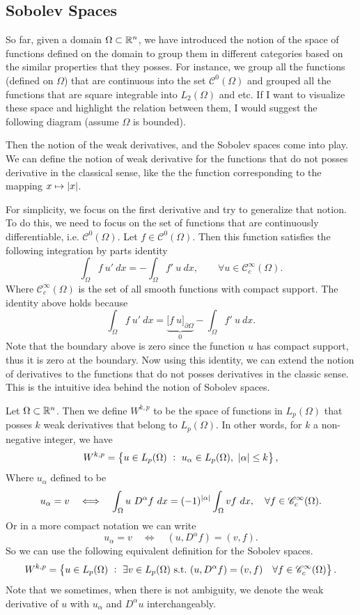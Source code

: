 \subsection{Sobolev Spaces}
So far, given a domain $ \Omega \subset \mathbb{R}^n $, we have introduced the notion of the space of functions defined on the domain to group them in different categories based on the similar properties that they posses. For instance, we group all the functions (defined on $ \Omega $) that are continuous into the set $ \mathscr{C}^0(\Omega) $ and grouped all the functions that are square integrable into $ L_2(\Omega) $ and etc. If I want to visualize these space and highlight the relation between them, I would suggest the following diagram (assume $ \Omega $ is bounded).

\FloatBarrier
\noindent Then the notion of the weak derivatives, and the Sobolev spaces come into play. We can define the notion of weak derivative for the functions that do not posses derivative in the classical sense, like the the function corresponding to the mapping $ x\mapsto |x| $. 

For simplicity, we focus on the first derivative and try to generalize that notion. To do this, we need to focus on the set of functions that are continuously differentiable, i.e. $ \mathscr{C}^0(\Omega) $. Let $ f\in \mathscr{C}^0(\Omega) $. Then this function satisfies the following integration by parts identity
\[  \boxed{\int_\Omega f\ u'\ dx =  -\int_\Omega f'\ u\ dx, \qquad \forall u \in \mathscr{C}^\infty_c(\Omega).} \]
Where $ \mathscr{C}^\infty_c(\Omega) $ is the set of all smooth functions with compact support. The identity above holds because
\[  \int_\Omega f\ u'\ dx  = \underbrace{\big[f\ u\big]_{\partial \Omega}}_{0}-\int_\Omega f'\ u\ dx . \]
Note that the boundary above is zero since the function $ u $ has compact support, thus it is zero at the boundary. Now using this identity, we can extend the notion of derivatives to the functions that do not posses derivatives in the classic sense. This is the intuitive idea behind the notion of Sobolev spaces. 

\begin{definition}
	Let $ \Omega\subset \mathbb{R}^n $. Then we define $ W^{k,p} $ to be the space of functions in $ L_p(\Omega) $ that posses $ k $ weak derivatives that belong to $ L_p(\Omega) $. In other words, for $ k $ a non-negative integer, we have
	\[ W^{k,p} = \left\{ u\in L_p(\Omega)\ :\  u_\alpha \in L_p(\Omega),\ |\alpha| \leq k  \right\}, \]
	Where $ u_\alpha $ defined to be
	\[  u_\alpha = v \quad \Longleftrightarrow \quad \int_\Omega u\ D^\alpha f\ dx = (-1)^{|\alpha|} \int_\Omega v f \ dx, \quad \forall f \in \mathscr{C}^\infty_c(\Omega). \]
	Or in a more compact notation we can write
	\[ u_\alpha = v \quad  \Longleftrightarrow \quad (u,D^\alpha f) = (v,f). \]
	So we can use the following equivalent definition for the Sobolev spaces.
	\[ W^{k,p} = \Set{u \in L_p(\Omega)\ :\ \exists v \in L_p(\Omega) \st (u,D^\alpha f) = (v,f) \quad \forall f \in \mathscr{C}^\infty_c(\Omega)}. \]
	Note that we sometimes, when there is not ambiguity, we denote the weak derivative of $ u $ with $ u_\alpha $ and $ D^\alpha u $ interchangeably.
\end{definition}

